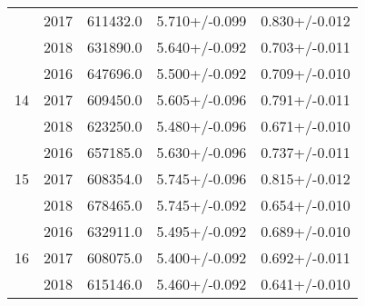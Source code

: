 \begin{table}
\begin{tabular}{ccccc}
   & 2017 &         611432.0 &            5.710+/-0.099 &          0.830+/-0.012 \\
   & 2018 &         631890.0 &            5.640+/-0.092 &          0.703+/-0.011 \\
\cline{1-5}
\multirow{3}{*}{14} & 2016 &         647696.0 &            5.500+/-0.092 &          0.709+/-0.010 \\
   & 2017 &         609450.0 &            5.605+/-0.096 &          0.791+/-0.011 \\
   & 2018 &         623250.0 &            5.480+/-0.096 &          0.671+/-0.010 \\
\cline{1-5}
\multirow{3}{*}{15} & 2016 &         657185.0 &            5.630+/-0.096 &          0.737+/-0.011 \\
   & 2017 &         608354.0 &            5.745+/-0.096 &          0.815+/-0.012 \\
   & 2018 &         678465.0 &            5.745+/-0.092 &          0.654+/-0.010 \\
\cline{1-5}
\multirow{3}{*}{16} & 2016 &         632911.0 &            5.495+/-0.092 &          0.689+/-0.010 \\
   & 2017 &         608075.0 &            5.400+/-0.092 &          0.692+/-0.011 \\
   & 2018 &         615146.0 &            5.460+/-0.092 &          0.641+/-0.010 \\
\bottomrule
\end{tabular}
\end{table}
